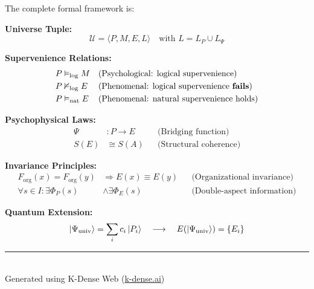 \documentclass[11pt,a4paper]{article}
\theoremstyle{definition}
\theoremstyle{plain}
\theoremstyle{remark}
\newcommand{\logent}{\vDash_{\text{log}}}
\newcommand{\notlogent}{\nvDash_{\text{log}}}
\newcommand{\natent}{\vDash_{\text{nat}}}
\newcommand{\Forg}{F_{\text{org}}}
\newcommand{\PhiP}{\Phi_{P}}
\newcommand{\PhiE}{\Phi_{E}}
\newcommand{\Psiuniv}{\Psi_{\text{univ}}}
\begin{document}
The complete formal framework is:

\begin{tcolorbox}[colback=yellow!5,colframe=orange!70,title=\textbf{The Chalmers Ansatz}]
\textbf{Universe Tuple:}
\begin{equation}
\mathcal{U} = \langle P, M, E, L \rangle \quad \text{with } L = L_P \cup L_\Psi
\end{equation}

\textbf{Supervenience Relations:}
\begin{align}
P &\logent M && \text{(Psychological: logical supervenience)} \\
P &\notlogent E && \text{(Phenomenal: logical supervenience \textbf{fails})} \\
P &\natent E && \text{(Phenomenal: natural supervenience holds)}
\end{align}

\textbf{Psychophysical Laws:}
\begin{align}
\Psi &: P \to E && \text{(Bridging function)} \\
S(E) &\cong S(A) && \text{(Structural coherence)}
\end{align}

\textbf{Invariance Principles:}
\begin{align}
\Forg(x) = \Forg(y) &\Rightarrow E(x) \equiv E(y) && \text{(Organizational invariance)} \\
\forall s \in I: \exists \PhiP(s) &\land \exists \PhiE(s) && \text{(Double-aspect information)}
\end{align}

\textbf{Quantum Extension:}
\begin{equation}
\ket{\Psiuniv} = \sum_i c_i \ket{P_i} \quad \longrightarrow \quad E(\ket{\Psiuniv}) = \{ E_i \}
\end{equation}
\end{tcolorbox}

\vfill

\begin{center}
\rule{0.5\textwidth}{0.4pt}\\[0.5em]
\small Generated using K-Dense Web (\href{https://k-dense.ai}{k-dense.ai})
\end{center}
\end{document}
